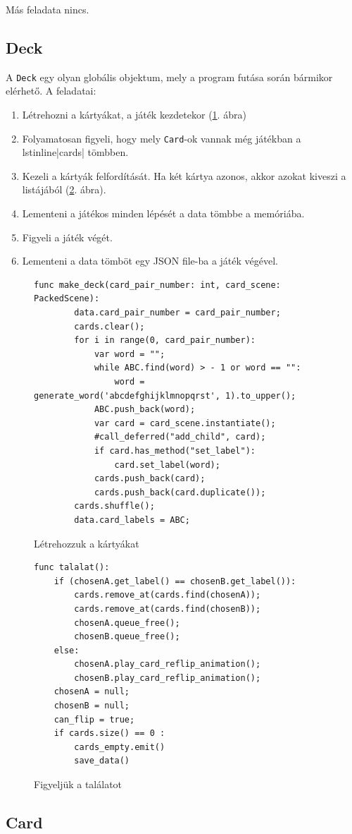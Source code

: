 Más feladata nincs. 


\subsection{Deck}
A \lstinline|Deck| egy olyan globális objektum, mely a program futása során bármikor elérhető. A feladatai: 
\begin{enumerate}
\item Létrehozni a kártyákat, a játék kezdetekor (\ref{code:make_deck}. ábra)
\item Folyamatosan figyeli, hogy mely \lstinline|Card|-ok vannak még játékban a lstinline|cards| tömbben.
\item Kezeli a kártyák felfordítását. Ha két kártya azonos, akkor azokat kiveszi a listájából (\ref{code:talalat}. ábra).
\item Lementeni a játékos minden lépését a data tömbbe a memóriába. 
\item Figyeli a játék végét.
\item Lementeni a data tömböt egy JSON file-ba a játék végével.
\end{enumerate}

\begin{figure}
    \centering
    \begin{lstlisting}[language=GDScript]
    func make_deck(card_pair_number: int, card_scene: PackedScene):
        data.card_pair_number = card_pair_number;
        cards.clear();
        for i in range(0, card_pair_number):
            var word = "";
            while ABC.find(word) > - 1 or word == "":
                word = generate_word('abcdefghijklmnopqrst', 1).to_upper();
            ABC.push_back(word);
            var card = card_scene.instantiate();
            #call_deferred("add_child", card);
            if card.has_method("set_label"):
                card.set_label(word);
            cards.push_back(card);
            cards.push_back(card.duplicate());
        cards.shuffle();
        data.card_labels = ABC;
    \end{lstlisting}
    \caption{Létrehozzuk a kártyákat}
    \label{code:make_deck}
\end{figure}
\begin{figure}
    \centeringx
    \begin{lstlisting}[language=GDScript]
func talalat():
	if (chosenA.get_label() == chosenB.get_label()):
		cards.remove_at(cards.find(chosenA));
		cards.remove_at(cards.find(chosenB));
		chosenA.queue_free();
		chosenB.queue_free();
	else:
		chosenA.play_card_reflip_animation();
		chosenB.play_card_reflip_animation();
	chosenA = null;
	chosenB = null;
	can_flip = true;
	if cards.size() == 0 :
		cards_empty.emit()
		save_data()
    \end{lstlisting}
    \caption{Figyeljük a találatot}
    \label{code:talalat}
\end{figure}


\subsection{Card}
